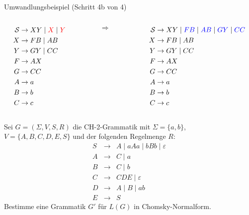 \documentclass{beamer}
\begin{document}
{{\begin{exampleblock}{Umwandlungsbeispiel (Schritt 4b von 4)}
\begin{columns}[c]
\begin{column}{0.3\textwidth}
\begin{align*}
\mathcal{S} &\rightarrow XY \mid \textcolor{red}{X} \mid  \textcolor{red}{Y}\\
X &\rightarrow FB \mid AB \\
Y &\rightarrow GY \mid CC\\
F &\rightarrow AX\\
G &\rightarrow CC\\
A &\rightarrow a\\
B &\rightarrow b\\
C &\rightarrow c\\
\end{align*}
\end{column}
%
\
\begin{column}{0.05\textwidth}
$\Rightarrow$
\end{column}
%
\begin{column}{0.3\textwidth}
\begin{align*}
\mathcal{S} &\rightarrow XY \mid \textcolor{blue}{FB} \mid \textcolor{blue}{AB} \mid \textcolor{blue}{GY} \mid \textcolor{blue}{CC}\\
X &\rightarrow FB \mid AB \\
Y &\rightarrow GY \mid CC\\
F &\rightarrow AX\\
G &\rightarrow CC\\
A &\rightarrow a\\
B &\rightarrow b\\
C &\rightarrow c\\
\end{align*}
\end{column}
\end{columns}
\end{exampleblock}
}

\begin{frame}
Sei $G=(\Sigma,V,S,R)$ die CH-2-Grammatik mit $\Sigma = \{a,b\}$, $V=\{A,B,C,D,E,S\}$ und der folgenden Regelmenge $R$:
\begin{eqnarray*}
S & \rightarrow & A \;|\; aAa  \;|\; bBb  \;|\; \varepsilon \\
A & \rightarrow & C \;|\; a \\
B & \rightarrow & C \;|\; b \\
C & \rightarrow & CDE \;|\; \varepsilon \\
D & \rightarrow & A \;|\; B \;|\; ab \\
E & \rightarrow & S
\end{eqnarray*}
Bestimme eine Grammatik $G'$ für $L(G)$ in Chomsky-Normalform.
\end{frame}

}
\end{document}
